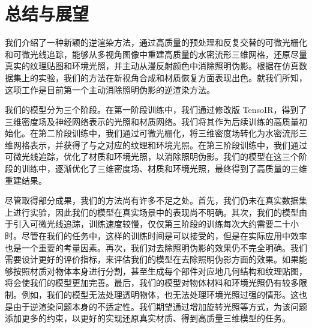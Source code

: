 \chapter{总结与展望}

我们介绍了一种新颖的逆渲染方法，通过高质量的预处理和反复交替的可微光栅化和可微光线追踪，能够从多视角图像中重建高质量的水密流形三维网格，还原尽量真实的纹理贴图和环境光照，并主动从漫反射颜色中消除照明伪影。根据在仿真数据集上的实验，我们的方法在新视角合成和材质恢复方面表现出色。就我们所知，这项工作是目前第一个主动消除照明伪影的逆渲染方法。

我们的模型分为三个阶段。在第一阶段训练中，我们通过修改版 TensoIR，得到了三维密度场及神经网络表示的光照和材质网络。我们将其作为后续训练的高质量初始化。在第二阶段训练中，我们通过可微光栅化，将三维密度场转化为水密流形三维网格表示，并获得了与之对应的纹理和环境光照。在第三阶段训练中，我们通过可微光线追踪，优化了材质和环境光照，以消除照明伪影。我们的模型在这三个阶段的训练中，逐渐优化了三维密度场、材质和环境光照，最终得到了高质量的三维重建结果。

尽管取得部分成果，我们的方法尚有许多不足之处。首先，我们仍未在真实数据集上进行实验，因此我们的模型在真实场景中的表现尚不明确。其次，我们的模型由于引入可微光线追踪，训练速度较慢，仅仅第三阶段的训练每次大约需要二十小时。尽管在我们的任务中，这样的训练时间是可以接受的，但是在实际应用中效率也是一个重要的考量因素。再次，我们对去除照明伪影的效果仍不完全明确。我们需要设计更好的评价指标，来评估我们的模型在去除照明伪影方面的效果。如果能够按照材质对物体本身进行分割，甚至生成每个部件对应地几何结构和纹理贴图，将会使我们的模型更加完善。最后，我们的模型对物体材料和环境光照仍有较多限制。例如，我们的模型无法处理透明物体，也无法处理环境光照过强的情形。这也是由于逆渲染问题本身的不适定性。我们期望通过增加旋转光照等方式，为该问题添加更多的约束，以更好的实现还原真实材质、得到高质量三维模型的任务。

